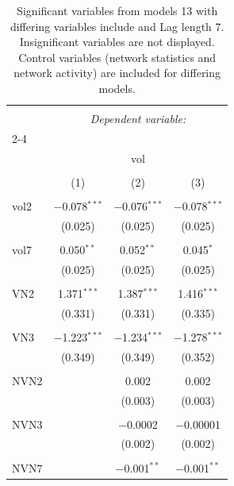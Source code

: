
\begin{table}[!htbp] \centering 
  \caption{Significant variables from models 13 with differing variables include 
                               and Lag length 7. Insignificant variables are not displayed. 
                               Control variables (network statistics and network activity) are 
                               included for differing models.} 
  \label{Volumemodels2_t} 
\scriptsize 
\begin{tabular}{@{\extracolsep{5pt}}lccc} 
\\[-1.8ex]\hline 
\hline \\[-1.8ex] 
 & \multicolumn{3}{c}{\textit{Dependent variable:}} \\ 
\cline{2-4} 
\\[-1.8ex] & \multicolumn{3}{c}{vol} \\ 
\\[-1.8ex] & (1) & (2) & (3)\\ 
\hline \\[-1.8ex] 
 vol2 & $-$0.078$^{***}$ & $-$0.076$^{***}$ & $-$0.078$^{***}$ \\ 
  & (0.025) & (0.025) & (0.025) \\ 
  & & & \\ 
 vol7 & 0.050$^{**}$ & 0.052$^{**}$ & 0.045$^{*}$ \\ 
  & (0.025) & (0.025) & (0.025) \\ 
  & & & \\ 
 VN2 & 1.371$^{***}$ & 1.387$^{***}$ & 1.416$^{***}$ \\ 
  & (0.331) & (0.331) & (0.335) \\ 
  & & & \\ 
 VN3 & $-$1.223$^{***}$ & $-$1.234$^{***}$ & $-$1.278$^{***}$ \\ 
  & (0.349) & (0.349) & (0.352) \\ 
  & & & \\ 
 NVN2 &  & 0.002 & 0.002 \\ 
  &  & (0.003) & (0.003) \\ 
  & & & \\ 
 NVN3 &  & $-$0.0002 & $-$0.00001 \\ 
  &  & (0.002) & (0.002) \\ 
  & & & \\ 
 NVN7 &  & $-$0.001$^{**}$ & $-$0.001$^{**}$ \\ 

\end{tabular}
\end{table}
